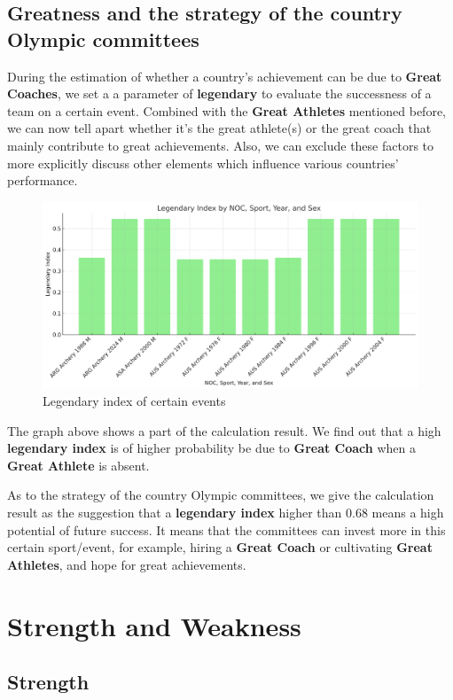 \subsection{Greatness and the strategy of the country Olympic committees}
During the estimation of whether a country's achievement can be due to \textbf{Great Coaches}, we set a a parameter of \textbf{legendary} to evaluate the successness of a team on a certain event.
Combined with the \textbf{Great Athletes} mentioned before, we can now tell apart whether it's the great athlete(s) or the great coach that mainly contribute to great achievements.
Also, we can exclude these factors to more explicitly discuss other elements which influence various countries' performance.
\begin{figure}[h]
    \centering
    \includegraphics[width=1\textwidth]{./figures/Legendary_index.png}
    \caption{Legendary index of certain events}
    \label{fig:legendary_index}
    \end{figure}
The graph above shows a part of the calculation result. We find out that a high \textbf{legendary index} is of higher probability be due to \textbf{Great Coach} when a \textbf{Great Athlete} is absent.

As to the strategy of the country Olympic committees, we give the calculation result as the suggestion that a \textbf{legendary index} higher than 0.68 means a high potential of future success.
It means that the committees can invest more in this certain sport/event, for example, hiring a \textbf{Great Coach} or cultivating \textbf{Great Athletes}, and hope for great achievements.
\section{Strength and Weakness}

\subsection{Strength}

